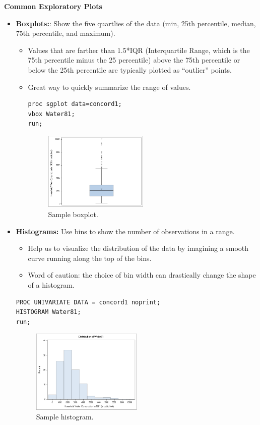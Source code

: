 \documentclass[12pt]{notes}
\begin{document}
\textbf{Common Exploratory Plots}
\begin{itemize}
\item \textbf{Boxplots:}: Show the five quartlies of the data (min, 25th percentile, median, 75th percentile, and maximum). 
\begin{itemize}
\item Values that are farther than 1.5*IQR (Interquartile Range, which is the 75th percentile minus the 25 percentile) above the 75th percentile or below the 25th percentile are typically plotted as ``outlier'' points. 
\item Great way to quickly summarize the range of values.

\begin{verbatim}
proc sgplot data=concord1;
vbox Water81;
run;
\end{verbatim}

\begin{figure}[H]
\centering
\includegraphics[width = 0.5\textwidth]{figures/module1/sampBox.png}
\caption{Sample boxplot.}
\end{figure}

\end{itemize}
\item \textbf{Histograms:} Use bins to show the number of observations in a range. 
\begin{itemize}
\item Help us to visualize the distribution of the data by imagining a smooth curve running along the top of the bins. 
\item Word of caution: the choice of bin width can drastically change the shape of a histogram. 
\end{itemize}

\begin{verbatim}
PROC UNIVARIATE DATA = concord1 noprint;
HISTOGRAM Water81;
run;
\end{verbatim}

\begin{figure}[H]
\centering
\includegraphics[width = 0.5\textwidth]{figures/module1/sampHist.png}
\caption{Sample histogram.}
\end{figure}


\end{itemize}
\end{document}
